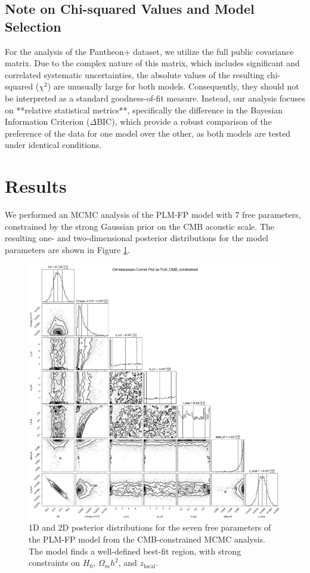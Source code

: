 \documentclass[12pt, a4paper]{article}
\begin{document}
\subsection{Note on Chi-squared Values and Model Selection}
For the analysis of the Pantheon+ dataset, we utilize the full public covariance matrix. Due to the complex nature of this matrix, which includes significant and correlated systematic uncertainties, the absolute values of the resulting chi-squared ($\chi^2$) are unusually large for both models. Consequently, they should not be interpreted as a standard goodness-of-fit measure. Instead, our analysis focuses on **relative statistical metrics**, specifically the difference in the Bayesian Information Criterion ($\Delta$BIC), which provide a robust comparison of the preference of the data for one model over the other, as both models are tested under identical conditions.

\section{Results}
We performed an MCMC analysis of the PLM-FP model with 7 free parameters, constrained by the strong Gaussian prior on the CMB acoustic scale. The resulting one- and two-dimensional posterior distributions for the model parameters are shown in Figure \ref{fig:corner_plot}.

\begin{figure}[H]
    \centering
    \includegraphics[width=\textwidth]{PLM_CMB_constrained_optimized_corner_plot.png}
    \caption{1D and 2D posterior distributions for the seven free parameters of the PLM-FP model from the CMB-constrained MCMC analysis. The model finds a well-defined best-fit region, with strong constraints on $H_0$, $\Omega_m h^2$, and $z_{\text{local}}$.}
    \label{fig:corner_plot}
\end{figure}
\end{document}
